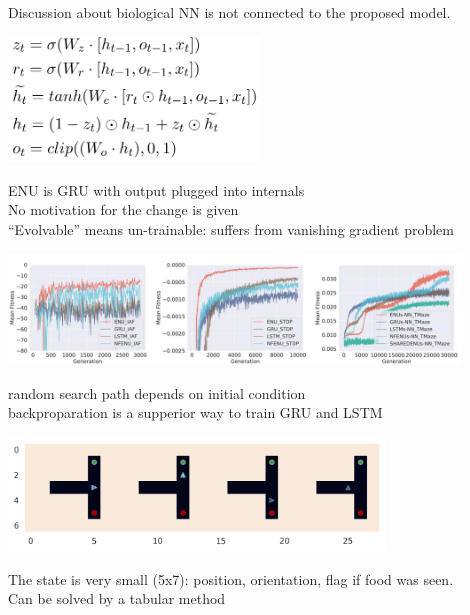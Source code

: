 \documentclass[aspectratio=169,8pt]{beamer}
\begin{document}
Discussion about biological NN is not connected to the proposed model.
\eframe

\begin{center}
  \includegraphics[width=0.50\textwidth]{i/eq.png}
\end{center}
ENU is GRU with output plugged into internals \\
No motivation for the change is given \\
``Evolvable'' means un-trainable: suffers from vanishing gradient problem
\eframe

\begin{center}
  \includegraphics[width=0.90\textwidth]{i/lines.png}
\end{center}
random search path depends on initial condition \\
backproparation is a supperior way to train GRU and LSTM
\eframe

\begin{center}
  \includegraphics[width=0.75\textwidth]{i/maze.png}
\end{center}
The state is very small (5x7): position, orientation, flag if food was seen. \\
Can be solved by a tabular method
\eframe
\end{document}
